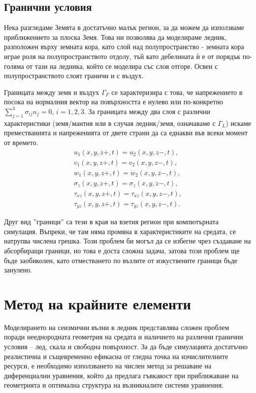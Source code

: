\documentclass{report}
\begin{document}
	\subsection{Гранични условия}
	
	Нека разгледаме Земята в достатъчно малък регион, за да можем да използваме приближението за плоска Земя. Това ни позволява да моделираме ледник, разположен върху земната кора, като слой над полупространство - земната кора играе роля на полупространството отдолу, тъй като дебелината ѝ е от порядък по-голяма от тази на ледника, който се моделира със слоя отгоре. Освен с полупространството слоят граничи и с въздух.
	
	Границата между земя и въздух $\Gamma_F$ се характеризира с това, че напрежението в посока на нормалния вектор на повърхността е нулево или по-конкретно $\displaystyle \sum_{j=1}^{3} \sigma_{ij}n_j = 0$, $i=1,2,3$. 
	За границата между два слоя с различни характеристики (земя/мантия или в случая ледник/земя, означаваме с $\Gamma_L$) искаме преместванията и напреженията от двете страни да са еднакви във всеки момент от времето.
	\begin{align*}
		u_1(x,y,z+,t)=u_2(x,y,z-,t),\\
		v_1(x,y,z+,t)=v_2(x,y,z-,t),\\
		w_1(x,y,z+,t)=w_2(x,y,z-,t),\\
		\sigma_z(x,y,z+,t)=\sigma_z(x,y,z-,t),\\
		\tau_{xz}(x,y,z+,t)=\tau_{xz}(x,y,z-,t),\\
		\tau_{yz}(x,y,z+,t)=\tau_{yz}(x,y,z-,t).
	\end{align*}
	
	Друг вид ''граници'' са тези в края на взетия регион при компютърната симулация. Въпреки, че там няма промяна в характеристиките на средата, се натрупва числена грешка. Този проблем би могъл да се избегне чрез създаване на абсорбиращи граници, но това е доста сложна задача, затова този проблем ще бъде заобиколен, като отместването по възлите от изкуствените граници бъде занулено.
	
	\section{Метод на крайните елементи}
	Моделирането на сеизмични вълни в ледник представлява сложен проблем поради нееднородната геометрия на средата и наличието на различни гранични условия – лед, скала и свободна повърхност. За да бъде симулацията достатъчно реалистична и същевременно ефикасна от гледна точка на изчислителните ресурси, е необходимо използването на числен метод за решаване на диференциални уравнения, който да предлага гъвкавост при приближаване на геометрията и оптимална структура на възникналите системи уравнения.
	
\end{document}
